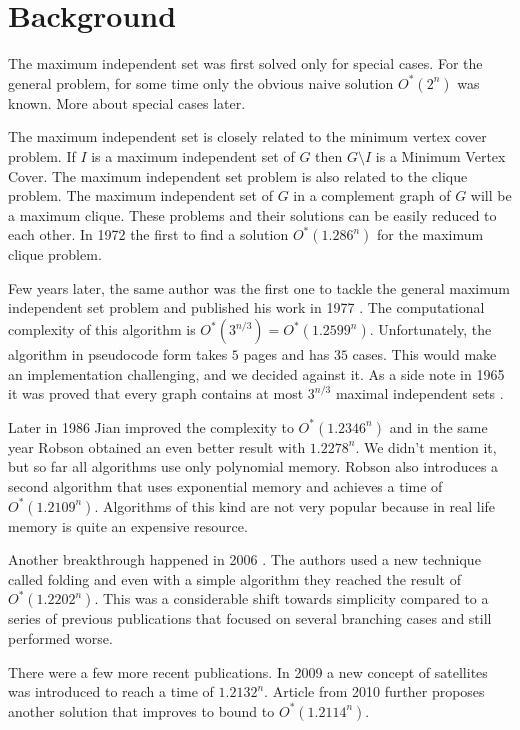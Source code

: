 \section{Background}

The maximum independent set was first solved only for special cases. For the general problem, for some time only the obvious naive solution $O^*(2^n)$ was known. More about special cases later.


The maximum independent set is closely related to the minimum vertex cover problem. If $I$ is a maximum independent set of $G$ then $G \setminus I$ is a Minimum Vertex Cover. The maximum independent set problem is also related to the clique problem. The maximum independent set of $G$ in a complement graph of $G$ will be a maximum clique. These problems and their solutions can be easily reduced to each other. In 1972 \citeauthor{tarjan1972finding} the first to find a solution $O^*(1.286^n)$ for the maximum clique problem.

Few years later, the same author was the first one to tackle the general maximum independent set problem and published his work in 1977 \cite{tarjan1977finding}. The computational complexity of this algorithm is $O^*(3^{n/3}) = O^*(1.2599^n)$. Unfortunately, the algorithm in pseudocode form takes $5$ pages and has $35$ cases. This would make an implementation challenging, and we decided against it. As a side note in 1965 it was proved that every graph contains at most $3^{n/3}$ maximal independent sets \cite{moon1965cliques}.

Later in 1986 Jian \cite{jian19862} improved the complexity to $O^*(1.2346^n)$ and in the same year Robson \cite{robson1986algorithms} obtained an even better result with $1.2278^n$. We didn't mention it, but so far all algorithms use only polynomial memory. Robson also introduces a second algorithm that uses exponential memory and achieves a time of $O^*(1.2109^n)$. Algorithms of this kind are not very popular because in real life memory is quite an expensive resource.

Another breakthrough happened in 2006 \cite{grandoni2006measure}. The authors used a new technique called folding and even with a simple algorithm they reached the result of $O^*(1.2202^n)$. This was a considerable shift towards simplicity compared to a series of previous publications that focused on several branching cases and still performed worse.

There were a few more recent publications. In 2009 \cite{kneis2009fine} a new concept of satellites was introduced to reach a time of $1.2132^n$. Article \cite{bourgeois2010bottom} from 2010 further proposes another solution that improves to bound to $O^*(1.2114^n)$.

